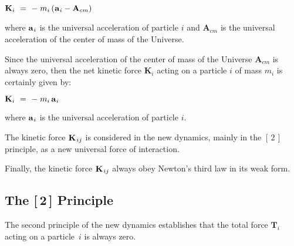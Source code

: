 \documentclass[10pt]{article}
\begin{document}
\par \bigskip ${\mathbf{K}}_{i} ~=~ - \; m_i \, (\hspace{+0.045em}{\mathbf{a}}_{\hspace{+0.045em}i} - {\mathbf{A}}_{cm})$

\par \bigskip \noindent where ${\mathbf{a}}_{\hspace{+0.045em}i}$ is the universal acceleration of particle $i$ and ${\mathbf{A}}_{cm}$ is the universal acceleration of the center of mass of the Universe.

\par \bigskip \noindent Since the universal acceleration of the center of mass of the Universe ${\mathbf{A}}_{cm}$ is always zero, then the net kinetic force ${\mathbf{K}}_{i}$ acting on a particle $i$ of mass $m_i$ is certainly given by:

\par \bigskip ${\mathbf{K}}_{i} ~=~ - \; m_i \, {\mathbf{a}}_{\hspace{+0.045em}i}$

\par \bigskip \noindent where ${\mathbf{a}}_{\hspace{+0.045em}i}$ is the universal acceleration of particle $i$.

\par \bigskip \noindent The kinetic force ${\mathbf{K}}_{\hspace{+0.060em}ij}$ is considered in the new dynamics, mainly in the $[\,2\,]$ principle, as a new universal force of interaction.

\par \bigskip \noindent Finally, the kinetic force ${\mathbf{K}}_{\hspace{+0.060em}ij}$ always obey Newton's third law in its weak form.

\vspace{+1.65em}

\par {\centering\subsection*{The [$\,$2$\,$] Principle}}

\par \bigskip\smallskip \noindent The second principle of the new dynamics establishes that the total force ${\mathbf{T}}_i$ acting on a \hbox {particle $i$} is always zero.
\end{document}
